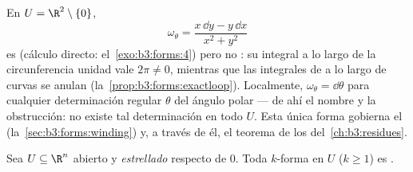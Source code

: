 \begin{example}\label{ex:b3:forms:angular}
En $U = \R^2 \setminus \{0\}$,
\[
\omega_\theta = \frac{x\,\dd y - y\,\dd x}{x^2 + y^2}
\]
es  (cálculo directo:
el~\cref{exo:b3:forms:4}) pero no
: su integral a lo largo de la
circunferencia unidad vale $2\pi \neq 0$, mientras que las integrales de
 a lo largo de curvas
 se anulan
(la~\cref{prop:b3:forms:exactloop}). Localmente,
$\omega_\theta = \dd\theta$ para cualquier determinación regular
$\theta$ del ángulo polar --- de ahí el nombre y la obstrucción: no
existe tal determinación en todo $U$. Esta única forma gobierna el
 (la~\cref{sec:b3:forms:winding})
y, a través de él, el teorema de los
del~\cref{ch:b3:residues}.
\end{example}

\begin{theorem}\label{thm:b3:forms:poincare}
Sea $U \subseteq \R^n$ abierto y \emph{estrellado} respecto de $0$. Toda
$k$-forma  en $U$ ($k \geq 1$)
es .
\end{theorem}

